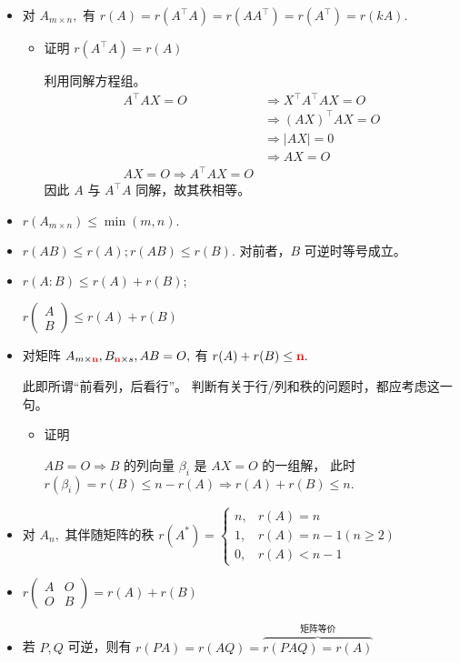 \begin{itemize}
    \item 对 $ A_{m\times n}, $ 有 $ r(A) = r(A^\top A) = r(AA^\top) = r(A^\top) = r(kA). $
    \begin{itemize}
        \item 证明 $ r(A^\top A) = r(A) $ 
        
        利用同解方程组。
        \begin{equation*}
            \begin{aligned}
                A^\top AX = O &\Rightarrow X^\top A^\top AX = O \\ 
                &\Rightarrow (AX)^\top AX = O \\ &\Rightarrow |AX| = 0
                \\ &\Rightarrow AX = O \\ 
                AX = O \Rightarrow A^\top AX = O
            \end{aligned}
        \end{equation*}
        因此 $ A $ 与 $ A^\top A $ 同解，故其秩相等。
    \end{itemize} 
    \item $ r(A_{m\times n})\leq \min(m,n). $ 
    \item $ r(AB) \leq r(A); r(AB) \leq r(B). $ 对前者，$ B $ 可逆时等号成立。
    \item $ r(A:B)\leq r(A) + r(B); $ 
    
    $ r(\begin{matrix}
        A \\ B 
    \end{matrix}) \leq r(A) + r(B)$ 
    \item 对矩阵 $ A_{m\times \textcolor{red}{\bf{n}}},B_{\textcolor{red}{\bf{n}}\times s}, AB=O, $
    有 $ r(A) + r(B) \leq \textcolor{red}{\bf{n}}. $ 
    
    此即所谓“前看列，后看行”。
    判断有关于行/列和秩的问题时，都应考虑这一句。
    \begin{itemize}
        \item 证明
        
        $AB = O \Rightarrow B $ 的列向量 $ \beta_i $ 是 $ AX=O $ 的一组解，
        此时 $ r(\beta_i) = r(B) \leq n - r(A) \Rightarrow r(A) + r(B) \leq n. $ 
    \end{itemize}
    \item 对 $ A_n, $ 其伴随矩阵的秩
    $ r(A^*)=\begin{cases}
        n,& r(A) = n\\ 1,&r(A) = n-1(n\geq 2)\\ 0,& r(A)< n-1
    \end{cases} $
    \item $ r\begin{pmatrix}
        A & O \\ O & B
    \end{pmatrix} = r(A) + r(B)$ 
    \item 若 $ P,Q $ 可逆，则有
    $ r(PA) = r(AQ) = \overbrace{r(PAQ) = r(A)}^{\textrm{矩阵等价}} $ 
    

\end{itemize}
